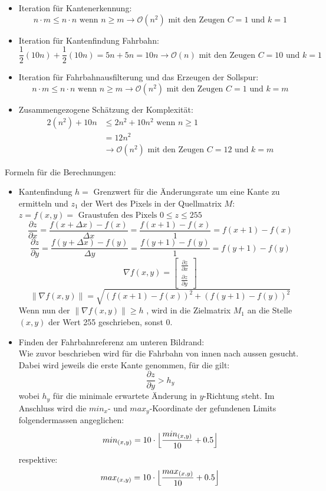 \begin{itemize}
\item Iteration für Kantenerkennung:
\[
n \cdot m \leq n \cdot n \text{ wenn } n\geq m \rightarrow \mathcal{O}(n^2) \text{ mit den Zeugen }C=1 \text{ und } k = 1
\]
\item Iteration für Kantenfindung Fahrbahn:
\[
\frac{1}{2}(10n) + \frac{1}{2}(10n) = 5n + 5n = 10n \rightarrow \mathcal{O}(n) \text{ mit den Zeugen }C=10 \text{ und } k = 1
\]
\item Iteration für Fahrbahnausfilterung und das Erzeugen der Sollspur:
\[
n \cdot m \leq n \cdot n \text{ wenn } n\geq m \rightarrow \mathcal{O}(n^2) \text{ mit den Zeugen }C=1 \text{ und } k = m
\]
\item Zusammengezogene Schätzung der Komplexität:
\begin{align*}
2(n^2) + 10n &\leq 2n^2 + 10n^2 \text{ wenn } n\geq 1\\
             &= 12n^2\\
             &\rightarrow \mathcal{O}(n^2) \text{ mit den Zeugen }C=12 \text{ und } k = m
\end{align*}
\end{itemize}
Formeln für die Berechnungen:
\begin{itemize}
\item Kantenfindung $h=$ Grenzwert für die Änderungsrate um eine Kante zu ermitteln und $z_1$ der Wert des Pixels in der Quellmatrix $M$:
$z = f(x,y) = \text{ Graustufen des Pixels }0 \leq z \leq 255$\\
\[
\frac{\partial{z}}{\partial{x}}=\frac{f(x+\Delta{x})-f(x)}{\Delta{x}} = \frac{f(x+1)-f(x)}{1} = f(x+1)-f(x)
\]
\[
\frac{\partial{z}}{\partial{y}}=\frac{f(y+\Delta{x})-f(y)}{\Delta{y}} = \frac{f(y+1)-f(y)}{1} = f(y+1)-f(y)
\]
\[
\nabla f(x,y) = \begin{bmatrix}
\frac{\partial{z}}{\partial{x}}\\
\frac{\partial{z}}{\partial{y}}
\end{bmatrix}
\]
\[
\lVert\nabla f(x,y)\rVert = \sqrt{(f(x+1)-f(x))^2 + (f(y+1) - f(y))^2}
\]
Wenn nun der $\lVert\nabla f(x,y)\rVert \geq h$ , wird in die Zielmatrix $M_1$ an die Stelle $(x,y)$ der Wert 255 geschrieben, sonst 0.
\item Finden der Fahrbahnreferenz am unteren Bildrand:\\
Wie zuvor beschrieben wird für die Fahrbahn von innen nach aussen gesucht. Dabei wird jeweils die erste Kante genommen, für die gilt:
\[
\frac{\partial{z}}{\partial{y}} > h_y
\]
wobei $h_y$ für die minimale erwartete Änderung in $y$-Richtung steht. Im Anschluss wird die $min_x$- und $max_y$-Koordinate der gefundenen Limits folgendermassen angeglichen:
\[
min_{(x,y)} = 10\cdot\Bigl\lfloor\frac{min_{(x,y)}}{10}+0.5\Bigr\rfloor
\]
respektive:
\[
max_{(x,y)} = 10\cdot\Bigl\lfloor\frac{max_{(x,y)}}{10}+0.5\Bigr\rfloor
\]
\end{itemize}
